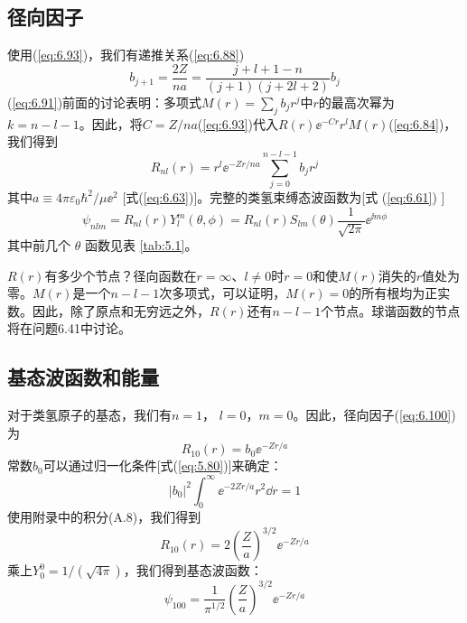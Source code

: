 \subsection*{径向因子}
    使用(\ref{eq:6.93})，我们有递推关系(\ref{eq:6.88})
    \begin{equation}
        b_{j+1} = \frac{2Z}{na} = \frac{j+l+1-n}{\left(j+1\right)\left(j+2l+2\right)}b_j
        \label{eq:6.99}
    \end{equation}
    (\ref{eq:6.91})前面的讨论表明：多项式$M\left(r\right) = \sum_{j}b_jr^j$中$r$的最高次幂为$k = n-l-1$。因此，将$C = Z/na$(\ref{eq:6.93})代入$R\left(r\right) \ee ^{-Cr}r^lM\left(r\right)$(\ref{eq:6.84})，我们得到
    \begin{equation}
        R_{nl}\left(r\right) = r^l\ee ^{-Zr/na}\sum_{j=0}^{n-l-1}b_jr^j
        \label{eq:6.100}
    \end{equation}
    其中$a \equiv 4\pi\varepsilon_0\hbar^2/\mu\ee ^2$ [式(\ref{eq:6.63})]。完整的类氢束缚态波函数为[式 (\ref{eq:6.61}) ]
    \begin{equation}
        \psi_{nlm} = R_{nl}\left(r\right)Y_l^m\left(\theta,\phi\right) = R_{nl}\left(r\right)S_{lm}\left(\theta\right)\frac{1}{\sqrt{2\pi}}\ee ^{\ii m\phi}
        \label{eq:6.101}
    \end{equation}
    其中前几个 $\theta$ 函数见表 \ref{tab:5.1}。

    $R\left(r\right)$有多少个节点？径向函数在$r = \infty$、$l \neq 0$时$r = 0$和使$M\left(r\right)$消失的$r$值处为零。$M\left(r\right)$是一个$n-l-1$次多项式，可以证明，$M\left(r\right) = 0$的所有根均为正实数。因此，除了原点和无穷远之外，$R\left(r\right)$还有$n-l-1$个节点。球谐函数的节点将在问题6.41中讨论。

\subsection*{基态波函数和能量}
    对于类氢原子的基态，我们有$n=1$， $l=0$，$m=0$。因此，径向因子(\ref{eq:6.100})为
    \begin{equation}
        R_{10}\left(r\right) = b_0\ee ^{-Zr/a}
        \label{eq:6.102}
    \end{equation}
    常数$b_0$可以通过归一化条件[式(\ref{eq:5.80})]来确定：
    \begin{equation*}
        \left|b_0\right|^2\int_{0}^{\infty}\ee ^{-2Zr/a}r^2\dd r = 1
    \end{equation*}
    使用附录中的积分(A.8)，我们得到
    \begin{equation}
        R_{10}\left(r\right) = 2\left(\frac{Z}{a}\right)^{3/2}\ee ^{-Zr/a}
        \label{eq:6.103}
    \end{equation}
    乘上$Y_0^0 = 1/\left(\sqrt{4\pi}\right)$，我们得到基态波函数：
    \begin{equation}
        \psi_{100} = \frac{1}{\pi^{1/2}}\left(\frac{Z}{a}\right)^{3/2}\ee ^{-Zr/a}
        \label{eq:6.104}
    \end{equation}

